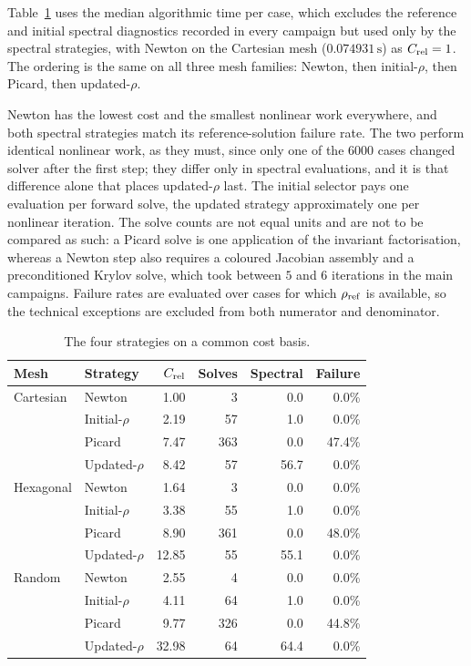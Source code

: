 Table~\ref{tab:strategy_comparison} uses the median algorithmic time per case, which excludes the reference and initial spectral diagnostics recorded in every campaign but used only by the spectral strategies, with Newton on the Cartesian mesh ($0.074931\,\mathrm{s}$) as $C_{\rm rel}=1$. The ordering is the same on all three mesh families: Newton, then initial-$\rho$, then Picard, then updated-$\rho$.

Newton has the lowest cost and the smallest nonlinear work everywhere, and both spectral strategies match its reference-solution failure rate. The two perform identical nonlinear work, as they must, since only one of the $6000$ cases changed solver after the first step; they differ only in spectral evaluations, and it is that difference alone that places updated-$\rho$ last. The initial selector pays one evaluation per forward solve, the updated strategy approximately one per nonlinear iteration. The solve counts are not equal units and are not to be compared as such: a Picard solve is one application of the invariant factorisation, whereas a Newton step also requires a coloured Jacobian assembly and a preconditioned Krylov solve, which took between $5$ and $6$ iterations in the main campaigns. Failure rates are evaluated over cases for which $\rho_{\rm ref}$ is available, so the technical exceptions are excluded from both numerator and denominator.

\begin{table}[h]
\centering
\caption{The four strategies on a common cost basis.}
\label{tab:strategy_comparison}
\begin{tabular}{llrrrr}
\toprule
\rowcolor{gray!12}
Mesh & Strategy & $C_{\rm rel}$ & Solves & Spectral & Failure \\
\midrule
Cartesian & Newton          &  1.00 &   3 &  0.0 &  0.0\% \\
          & Initial-$\rho$  &  2.19 &  57 &  1.0 &  0.0\% \\
          & Picard          &  7.47 & 363 &  0.0 & 47.4\% \\
          & Updated-$\rho$  &  8.42 &  57 & 56.7 &  0.0\% \\
\midrule
Hexagonal & Newton          &  1.64 &   3 &  0.0 &  0.0\% \\
          & Initial-$\rho$  &  3.38 &  55 &  1.0 &  0.0\% \\
          & Picard          &  8.90 & 361 &  0.0 & 48.0\% \\
          & Updated-$\rho$  & 12.85 &  55 & 55.1 &  0.0\% \\
\midrule
Random    & Newton          &  2.55 &   4 &  0.0 &  0.0\% \\
          & Initial-$\rho$  &  4.11 &  64 &  1.0 &  0.0\% \\
          & Picard          &  9.77 & 326 &  0.0 & 44.8\% \\
          & Updated-$\rho$  & 32.98 &  64 & 64.4 &  0.0\% \\
\bottomrule
\end{tabular}
\end{table}

